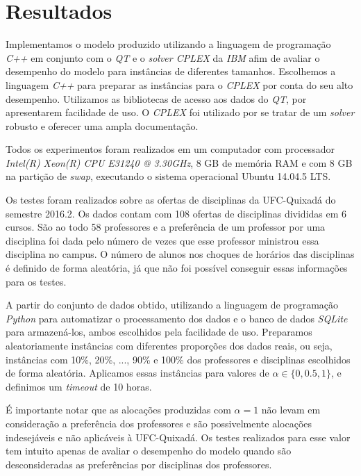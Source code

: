 \chapter{Resultados}
\label{chap:resultados}

Implementamos o modelo produzido utilizando a linguagem de programação \textit{C++} \cite{c++} em conjunto com o \textit{QT} \cite{qt} e o \textit{solver CPLEX} da \textit{IBM} \cite{ibmcplex} afim de avaliar o desempenho do modelo para instâncias de diferentes tamanhos. Escolhemos a linguagem \textit{C++} para preparar as instâncias para o \textit{CPLEX} por conta do seu alto desempenho. Utilizamos as bibliotecas de acesso aos dados do \textit{QT}, por apresentarem facilidade de uso. O \textit{CPLEX} foi utilizado por se tratar de um \textit{solver} robusto e oferecer uma ampla documentação.

Todos os experimentos foram realizados em um computador com processador \textit{Intel(R) Xeon(R) CPU E31240 @ 3.30GHz}, 8 GB de memória RAM e com 8 GB na partição de \textit{swap}, executando o sistema operacional Ubuntu 14.04.5 LTS.

Os testes foram realizados sobre as ofertas de disciplinas da UFC-Quixadá do semestre 2016.2. Os dados contam com 108 ofertas de disciplinas divididas em 6 cursos. São ao todo 58 professores e a preferência de um professor por uma disciplina foi dada pelo número de vezes que esse professor ministrou essa disciplina no campus. O número de alunos nos choques de horários das disciplinas é definido de forma aleatória, já que não foi possível conseguir essas informações para os testes. 

A partir do conjunto de dados obtido, utilizando a linguagem de programação \textit{Python} \cite{python} para automatizar o processamento dos dados e o banco de dados \textit{SQLite} \cite{sqlite} para armazená-los, ambos escolhidos pela facilidade de uso. Preparamos aleatoriamente instâncias com diferentes proporções dos dados reais, ou seja, instâncias com 10\%, 20\%, ..., 90\% e 100\% dos professores e disciplinas escolhidos de forma aleatória. Aplicamos essas instâncias para valores de $\alpha \in{\{0, 0.5, 1\}}$, e definimos um \textit{timeout} de 10 horas.

É importante notar que as alocações produzidas com $\alpha = 1$ não levam em consideração a preferência dos professores e são possivelmente alocações indesejáveis e não aplicáveis à UFC-Quixadá. Os testes realizados para esse valor tem intuito apenas de avaliar o desempenho do modelo quando são desconsideradas as preferências por disciplinas dos professores.

